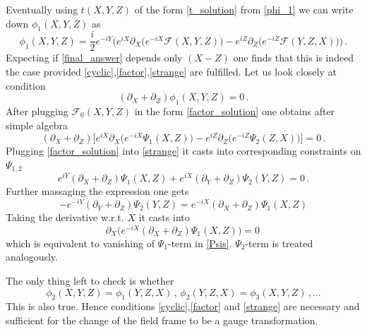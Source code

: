 \documentclass[12pt]{article}
\begin{document}
Eventually using $t(X,Y,Z)$ of the form \eqref{t_solution} from \eqref{phi_1} we can write down $\phi_1(X,Y,Z)$ as 
\begin{equation}\label{final_answer}
\phi_1(X,Y,Z)=\frac{i}{2} e^{-iY}\Big(e^{iX}\partial_X\big(e^{-iX}\mathscr{F}(X,Y,Z)\big)-e^{iZ}\partial_Z\big(e^{-iZ} \mathscr{F}(Y,Z,X)\big)\Big)\,.
\end{equation}
Expecting if \eqref{final_answer} depends only $(X-Z)$ one finds that this is indeed the case provided \eqref{cyclic},\eqref{factor},\eqref{strange} are fulfilled. Let us look closely at condition
\begin{equation}
(\partial_X+\partial_Z)\phi_1(X,Y,Z)=0\,.
\end{equation}
After plugging $\mathscr{F}_0(X,Y,Z)$ in the form \eqref{factor_solution} one obtains after simple algebra
\begin{equation}\label{Psis}
(\partial_X+\partial_Z)\Big[e^{iX}\partial_X\big(e^{-iX}\Psi_1(X,Z)\big)-e^{iZ}\partial_Z\big(e^{-iZ}\Psi_2(Z,X)\big)\Big]=0\,.
\end{equation}
Plugging \eqref{factor_solution} into \eqref{strange} it casts into  corresponding constraints on $\Psi_{1,2}$
\begin{equation}
e^{iY}(\partial_X+\partial_Z)\Psi_1(X,Z)+e^{iX}(\partial_Y+\partial_Z)\Psi_2(Y,Z)=0\,.
\end{equation}
Further massaging the expression one gets
\begin{equation}
-e^{-iY}(\partial_Y+\partial_Z)\Psi_2(Y,Z)=e^{-iX}(\partial_X+\partial_Z)\Psi_1(X,Z)
\end{equation}
Taking the derivative w.r.t. $X$ it casts into
\begin{equation}
\partial_X\big(e^{-iX}(\partial_X+\partial_Z)\Psi_1(X,Z)\big)=0\,
\end{equation}
which is equivalent to vanishing of $\Psi_1$-term in \eqref{Psis}. $\Psi_2$-term is treated analogously.

The only thing left to check is whether 
\begin{equation}
\phi_2(X,Y,Z)=\phi_1(Y,Z,X)\,,\, \phi_2(Y,Z,X)=\phi_3(X,Y,Z)\,,\ldots
\end{equation}
This is also true. Hence conditions \eqref{cyclic},\eqref{factor} and \eqref{strange} are necessary and sufficient for the change of the field frame to be a gauge transformation.

\end{document}
